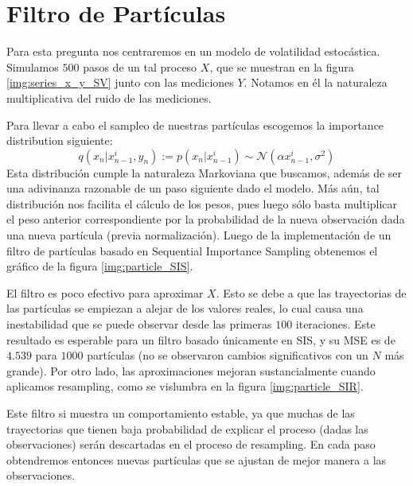 \documentclass[letterpaper,11pt,oneside]{article}
\begin{document}
\section{Filtro de Partículas}
Para esta pregunta nos centraremos en un modelo de volatilidad estocástica. Simulamos $500$ pasos de un tal proceso $X$, que se muestran en la figura \ref{img:series_x_y_SV} junto con las mediciones $Y$. Notamos en él la naturaleza multiplicativa del ruido de las mediciones.


Para llevar a cabo el sampleo de nuestras partículas escogemos la importance distribution siguiente:
$$ q(x_n|x_{n-1}^i,y_n):=p(x_n|x_{n-1}^i) \sim \mathcal{N}(\alpha x^i_{n-1},\sigma^2) $$
Esta distribución cumple la naturaleza Markoviana que buscamos, además de ser una adivinanza razonable de un paso siguiente dado el modelo. Más aún, tal distribución nos facilita el cálculo de los pesos, pues luego sólo basta multiplicar el peso anterior correspondiente por la probabilidad de la nueva observación dada una nueva partícula (previa normalización). Luego de la implementación de un filtro de partículas basado en Sequential Importance Sampling obtenemos el gráfico de la figura \ref{img:particle_SIS}.


El filtro es poco efectivo para aproximar $X$. Esto se debe a que las trayectorias de las partículas se empiezan a alejar de los valores reales, lo cual causa una inestabilidad que se puede observar desde las primeras $100$ iteraciones. Este resultado es esperable para un filtro basado únicamente en SIS, y su MSE es de $4.539$ para $1000$ partículas (no se observaron cambios significativos con un $N$ más grande). Por otro lado, las aproximaciones mejoran sustancialmente cuando aplicamos resampling, como se vislumbra en la figura \ref{img:particle_SIR}.


Este filtro si muestra un comportamiento estable, ya que muchas de las trayectorias que tienen baja probabilidad de explicar el proceso (dadas las observaciones) serán descartadas en el proceso de resampling. En cada paso obtendremos entonces nuevas partículas que se ajustan de mejor manera a las observaciones.

\end{document}
